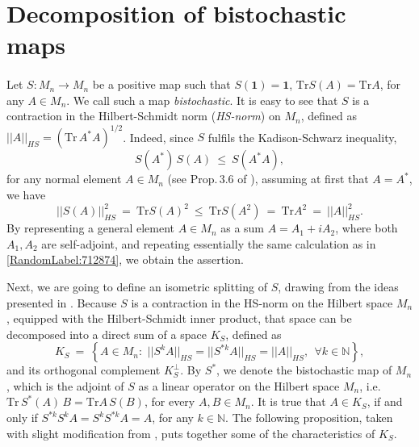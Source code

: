 \documentclass[12pt]{article}
\theoremstyle{plain}
\theoremstyle{definition}
\theoremstyle{remark}
\numberwithin{equation}{section}
\begin{document}
\section{Decomposition of bistochastic maps}
\label{sec:Decomposition}

\paragraph{}
Let $S\!: M_{n} \rightarrow M_{n}$ be a positive map such that
$S(\mathbf{1}) = \mathbf{1}$,
$\text{Tr} S(A) = \text{Tr} A$,
for any $A \in M_{n}$.
We call such a map \emph{bistochastic}.
It is easy to see that $S$ is a contraction in
the Hilbert-Schmidt norm (\emph{HS-norm}) on $M_{n}$,
defined as
$||A||_{HS} = \left( \text{Tr} \, A^{*} A \right)^{1/2}$.
Indeed,
since $S$ fulfils the Kadison-Schwarz inequality,
\begin{equation}
\label{eq:SchwarzInequality}
    S(A^{*}) \, S(A) \: \leq \: S(A^{*} A),
\end{equation}
for any normal element $A \in M_{n}$ (see Prop.\,3.6 of \cite{choi1980some}),
assuming at first that $A = A^{*}$,
we have
\begin{equation}
\label{RandomLabel:712874}
    || S(A) ||_{HS}^{2} \: = \: \text{Tr} S(A)^{2}
    \: \leq \:  \text{Tr} S(A^{2}) \: = \:
        \text{Tr} A^{2} \: = \: ||A||_{HS}^{2}.
\end{equation}
By representing a general element $A \in M_{n}$ as a sum
$A = A_{1} + i A_{2}$,
where both $A_{1}, A_{2}$ are self-adjoint,
and repeating essentially the same calculation as in
\eqref{RandomLabel:712874},
we obtain the assertion.

Next,
we are going to define an isometric splitting of $S$,
drawing from the ideas presented in \cite{olkiewicz1999environment}.
Because $S$ is a contraction in the HS-norm on the Hilbert space $M_{n}$,
equipped with the Hilbert-Schmidt inner product,
that space can be decomposed into a direct sum of a space $K_{S}$,
defined as
\begin{equation}
\label{def:definitionofK}
    K_{S} \: = \: \left\{
        A \in M_{n}: \,\,
            || S^{k} A ||_{HS} = || S^{* k} A ||_{HS} = || A ||_{HS}, \:\:
            \forall k \in \mathbb{N}
        \right\},
\end{equation}
and its orthogonal complement $K_{S}^{\perp}$.
By $S^{*}$, we denote the bistochastic map of $M_{n}$,
which is the adjoint of $S$ as a linear operator on the Hilbert space $M_{n}$,
i.e. $\text{Tr}\, S^{*} (A)\, B = \text{Tr} A \, S(B)$,
for every $A, B \in M_{n}$.
It is true that $A \in K_{S}$,
if and only if
$S^{* k} S^{k} A = S^{k} S^{* k} A = A$,
for any $k \in \mathbb{N}$.
The following proposition,
taken with slight modification from
\cite{olkiewicz1999environment},
puts together some of the characteristics of $K_{S}$.
\end{document}
